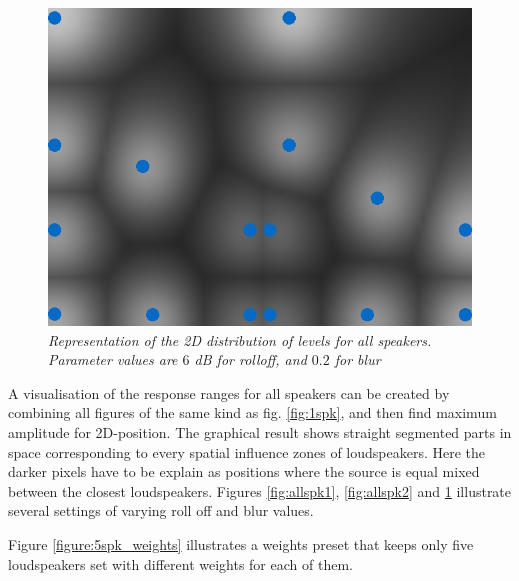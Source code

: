 \documentclass[twoside,10pt]{article}
\begin{document}
\begin{figure}[ht]
\centerline{\includegraphics[scale=0.5]{all_r_6_b_0_2}}
\caption{{\it Representation of the 2D distribution of levels for all speakers. Parameter values are $6$ dB for rolloff, and $0.2$ for blur}}  
\label{fig:allspk3}
\end{figure}

A visualisation of the response ranges for all speakers can be created by combining all figures of the same kind as fig. \ref{fig:1spk}, and then find maximum amplitude for 2D-position. The graphical result shows straight segmented parts in space corresponding to every spatial influence zones of loudspeakers. Here the darker pixels have to be explain as positions where the source is equal mixed between the closest loudspeakers. Figures \ref{fig:allspk1}, \ref{fig:allspk2} and \ref{fig:allspk3} illustrate several settings of varying roll off and blur values. 

Figure \ref{figure:5spk_weights} illustrates a weights preset that keeps only five loudspeakers set with different weights for each of them.
\end{document}
